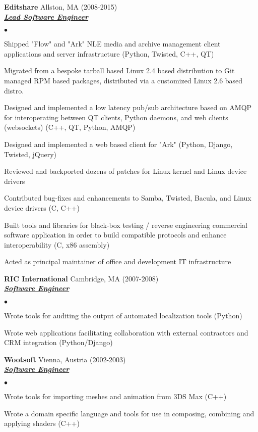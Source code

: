 \documentclass{article}
\newcommand{\employer}[4]{{ \textbf{#1} #2 (#3)\\ \underline{\textbf{\emph{#4}}}\\  }}
\newenvironment{achievements}{\begin{list}{$\bullet$}{\topsep 0pt \itemsep -2pt}}{\vspace*{4pt}\end{list}}
\begin{document}
	\employer{Editshare} {Allston, MA} {2008-2015} {Lead Software Engineer}
	\begin{achievements}
	\item Shipped "Flow" and "Ark" NLE media and archive management client applications and server infrastructure (Python, Twisted, C++, QT)
	\item Migrated from a bespoke tarball based Linux 2.4 based distribution to Git managed RPM based packages, distributed via a customized Linux 2.6 based distro.
	\item Designed and implemented a low latency pub/sub architecture based on AMQP for interoperating between QT clients, Python daemons, and web clients (websockets) (C++, QT, Python, AMQP)
	\item Designed and implemented a web based client for "Ark" (Python, Django, Twisted, jQuery)
	\item Reviewed and backported dozens of patches for Linux kernel and Linux device drivers
	\item Contributed bug-fixes and enhancements to Samba, Twisted, Bacula, and Linux device drivers (C, C++)
	\item Built tools and libraries for black-box testing / reverse engineering commercial software application in order to build compatible protocols and enhance interoperability (C, x86 assembly)
	\item Acted as principal maintainer of office and development IT infrastructure
	\end{achievements}

	\employer{RIC International} {Cambridge, MA} {2007-2008} {Software Engineer}
	\begin{achievements}
	\item Wrote tools for auditing the output of automated localization tools (Python)
	\item Wrote web applications facilitating collaboration with external contractors and CRM integration (Python/Django)
	\end{achievements}

	\employer{Wootsoft} {Vienna, Austria} {2002-2003} {Software Engineer}
	\begin{achievements}
	\item Wrote tools for importing meshes and animation from 3DS Max (C++)
	\item Wrote a domain specific language and tools for use in composing, combining and applying shaders (C++)
	\end{achievements}
\end{document}

